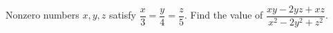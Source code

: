 Nonzero numbers $x, y, z$ satisfy $\dfrac{x}{3}=\dfrac{y}{4}=\dfrac{z}{5}$. Find the value of $\dfrac{xy-2yz+xz}{x^{2}-2y^{2}+z^{2}}$.
